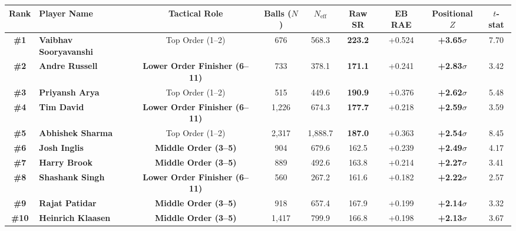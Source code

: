 \documentclass[10pt,a4paper]{article}
\begin{document}
\begin{center}
\small
\begin{tabularx}{\textwidth}{c l c c c c c c c}
\toprule
\textbf{Rank} & \textbf{Player Name} & \textbf{Tactical Role} & \textbf{Balls ($N$)} & \textbf{$N_{\text{eff}}$} & \textbf{Raw SR} & \textbf{EB RAE} & \textbf{Positional $Z$} & \textbf{$t$-stat} \\
\midrule
\textbf{\#1} & \textbf{Vaibhav Sooryavanshi} & Top Order (1--2) & 676 & 568.3 & \textbf{223.2} & +0.524 & \textbf{+3.65$\sigma$} & 7.70 \\
\textbf{\#2} & \textbf{Andre Russell} & \textbf{Lower Order Finisher (6--11)} & 733 & 378.1 & \textbf{171.1} & +0.241 & \textbf{+2.83$\sigma$} & 3.42 \\
\textbf{\#3} & \textbf{Priyansh Arya} & Top Order (1--2) & 515 & 449.6 & \textbf{190.9} & +0.376 & \textbf{+2.62$\sigma$} & 5.48 \\
\textbf{\#4} & \textbf{Tim David} & \textbf{Lower Order Finisher (6--11)} & 1,226 & 674.3 & \textbf{177.7} & +0.218 & \textbf{+2.59$\sigma$} & 3.59 \\
\textbf{\#5} & \textbf{Abhishek Sharma} & Top Order (1--2) & 2,317 & 1,888.7 & \textbf{187.0} & +0.363 & \textbf{+2.54$\sigma$} & 8.45 \\
\textbf{\#6} & \textbf{Josh Inglis} & \textbf{Middle Order (3--5)} & 904 & 679.6 & 162.5 & +0.239 & \textbf{+2.49$\sigma$} & 4.17 \\
\textbf{\#7} & \textbf{Harry Brook} & \textbf{Middle Order (3--5)} & 889 & 492.6 & 163.8 & +0.214 & \textbf{+2.27$\sigma$} & 3.41 \\
\textbf{\#8} & \textbf{Shashank Singh} & \textbf{Lower Order Finisher (6--11)} & 560 & 267.2 & 161.6 & +0.182 & \textbf{+2.22$\sigma$} & 2.57 \\
\textbf{\#9} & \textbf{Rajat Patidar} & \textbf{Middle Order (3--5)} & 918 & 657.4 & 167.9 & +0.199 & \textbf{+2.14$\sigma$} & 3.32 \\
\textbf{\#10} & \textbf{Heinrich Klaasen} & \textbf{Middle Order (3--5)} & 1,417 & 799.9 & 166.8 & +0.198 & \textbf{+2.13$\sigma$} & 3.67 \\
\bottomrule
\end{tabularx}
\end{center}
\end{document}
